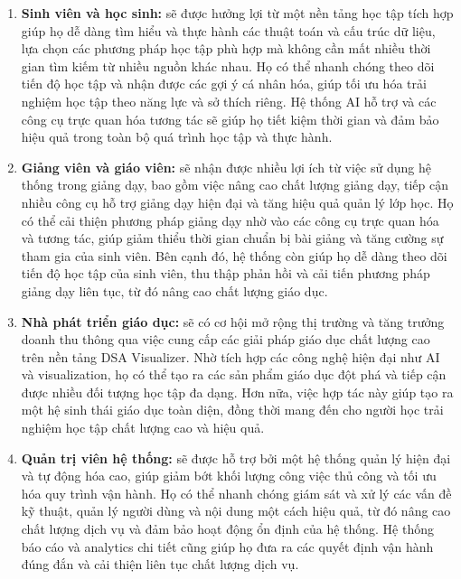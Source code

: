 \begin{enumerate}
\item \textbf{Sinh viên và học sinh:} sẽ được hưởng lợi từ một nền tảng học tập tích hợp giúp họ dễ dàng tìm hiểu và thực hành các thuật toán và cấu trúc dữ liệu, lựa chọn các phương pháp học tập phù hợp mà không cần mất nhiều thời gian tìm kiếm từ nhiều nguồn khác nhau. Họ có thể nhanh chóng theo dõi tiến độ học tập và nhận được các gợi ý cá nhân hóa, giúp tối ưu hóa trải nghiệm học tập theo năng lực và sở thích riêng. Hệ thống AI hỗ trợ và các công cụ trực quan hóa tương tác sẽ giúp họ tiết kiệm thời gian và đảm bảo hiệu quả trong toàn bộ quá trình học tập và thực hành.

\item \textbf{Giảng viên và giáo viên:} sẽ nhận được nhiều lợi ích từ việc sử dụng hệ thống trong giảng dạy, bao gồm việc nâng cao chất lượng giảng dạy, tiếp cận nhiều công cụ hỗ trợ giảng dạy hiện đại và tăng hiệu quả quản lý lớp học. Họ có thể cải thiện phương pháp giảng dạy nhờ vào các công cụ trực quan hóa và tương tác, giúp giảm thiểu thời gian chuẩn bị bài giảng và tăng cường sự tham gia của sinh viên. Bên cạnh đó, hệ thống còn giúp họ dễ dàng theo dõi tiến độ học tập của sinh viên, thu thập phản hồi và cải tiến phương pháp giảng dạy liên tục, từ đó nâng cao chất lượng giáo dục.

\item \textbf{Nhà phát triển giáo dục:} sẽ có cơ hội mở rộng thị trường và tăng trưởng doanh thu thông qua việc cung cấp các giải pháp giáo dục chất lượng cao trên nền tảng DSA Visualizer. Nhờ tích hợp các công nghệ hiện đại như AI và visualization, họ có thể tạo ra các sản phẩm giáo dục đột phá và tiếp cận được nhiều đối tượng học tập đa dạng. Hơn nữa, việc hợp tác này giúp tạo ra một hệ sinh thái giáo dục toàn diện, đồng thời mang đến cho người học trải nghiệm học tập chất lượng cao và hiệu quả.

\item \textbf{Quản trị viên hệ thống:} sẽ được hỗ trợ bởi một hệ thống quản lý hiện đại và tự động hóa cao, giúp giảm bớt khối lượng công việc thủ công và tối ưu hóa quy trình vận hành. Họ có thể nhanh chóng giám sát và xử lý các vấn đề kỹ thuật, quản lý người dùng và nội dung một cách hiệu quả, từ đó nâng cao chất lượng dịch vụ và đảm bảo hoạt động ổn định của hệ thống. Hệ thống báo cáo và analytics chi tiết cũng giúp họ đưa ra các quyết định vận hành đúng đắn và cải thiện liên tục chất lượng dịch vụ.
\end{enumerate}

